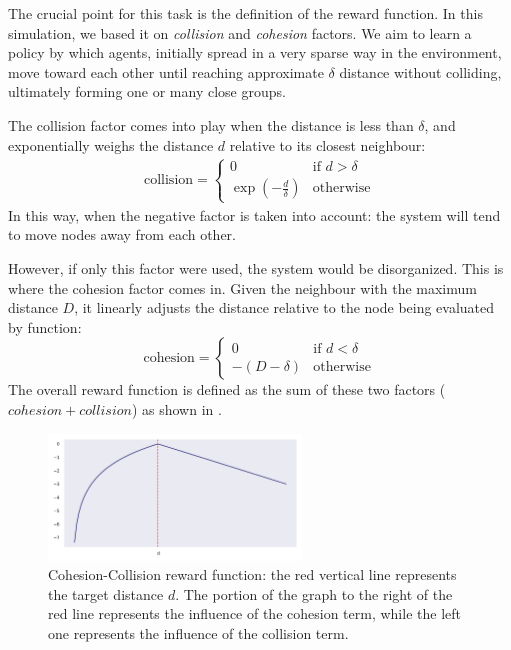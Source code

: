 The crucial point for this task is
 the definition of the reward function. 
 In this simulation, we based it on \emph{collision} and \emph{cohesion} factors. 
%
We aim to learn a policy by which agents, initially spread in a very sparse way in the environment, move toward each other until reaching approximate $\delta$  distance without colliding, ultimately forming one or many close groups.
%

The collision factor comes into play when the distance is less than $\delta$, 
 and exponentially weighs the distance $d$ relative to its closest neighbour:
\begin{equation}
    \label{coordination2023:eq:collision-factor}
    \begin{split}
        \text{collision} = \begin{cases}
            0 & \text{if } d > \delta \\
            \exp\left(-\frac{d}{\delta}\right) & \text{otherwise}
        \end{cases}
    \end{split}
\end{equation}
In this way, when the negative factor is taken into account: 
 the system will tend to move nodes away from each other.

However, if only this factor were used, 
 the system would be disorganized. 
 This is where the cohesion factor comes in. 
 Given the neighbour with the maximum distance $D$, 
 it linearly adjusts the distance relative to the node being evaluated by function:
\begin{equation}
    \text{cohesion} = \begin{cases}
        0 & \text{if } d < \delta \\
        -(D - \delta) & \text{otherwise}
    \end{cases}
\end{equation}
%
The overall reward function is defined as the sum of these two factors ($cohesion + collision$)
 as shown in .
 \begin{figure}[t]
    \centering
    \includegraphics[width=0.6\textwidth]{papers/coordination2023/imgs/ccreward.pdf}
    \caption[cohesion collision reward function]{Cohesion-Collision reward function: the red vertical line represents the target distance $d$.
        The portion of the graph to the right of the red line represents the influence of the cohesion term,
        while the left one represents the influence of the collision term.
    }
    \label{coordination2023:fig:cc-rf}
\end{figure}


